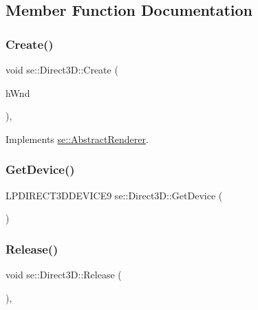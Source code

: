 \subsection{Member Function Documentation}
\mbox{\label{classse_1_1_direct3_d_a316456762829db0614077cccd655e654}} 
\subsubsection{\texorpdfstring{Create()}{Create()}}
{\footnotesize\ttfamily void se\+::\+Direct3\+D\+::\+Create (\begin{DoxyParamCaption}\item[{H\+W\+ND}]{h\+Wnd }\end{DoxyParamCaption})\hspace{0.3cm}{\ttfamily [override]}, {\ttfamily [virtual]}}



Implements \mbox{\hyperlink{classse_1_1_abstract_renderer_afdfce8b91028448c17ce27550827f192}{se\+::\+Abstract\+Renderer}}.

\mbox{\label{classse_1_1_direct3_d_a0735c84f0cdd65088702b03c4ed7c7b7}} 
\subsubsection{\texorpdfstring{Get\+Device()}{GetDevice()}}
{\footnotesize\ttfamily L\+P\+D\+I\+R\+E\+C\+T3\+D\+D\+E\+V\+I\+C\+E9 se\+::\+Direct3\+D\+::\+Get\+Device (\begin{DoxyParamCaption}{ }\end{DoxyParamCaption})}

\mbox{\label{classse_1_1_direct3_d_ae2979f16a5c35773cf2c243d8e6f90e4}} 
\subsubsection{\texorpdfstring{Release()}{Release()}}
{\footnotesize\ttfamily void se\+::\+Direct3\+D\+::\+Release (\begin{DoxyParamCaption}{ }\end{DoxyParamCaption})\hspace{0.3cm}{\ttfamily [override]}, {\ttfamily [virtual]}}



